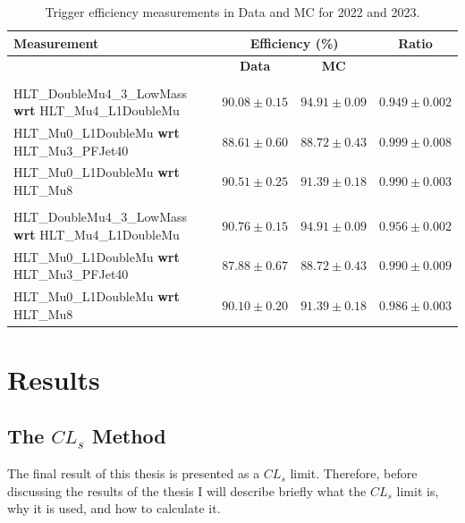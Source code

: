 \begin{table}[ht]
    \centering
    \begin{tabular}{|>{\footnotesize\raggedright\arraybackslash}p{10cm}|c|c|c|}
    \hline
    \textbf{Measurement} & \multicolumn{2}{c|}{\textbf{Efficiency (\%)}} & \textbf{Ratio} \\
    \cline{2-3}
    & \textbf{Data} & \textbf{MC} & \\
    \hline
    \multicolumn{4}{|c|}{\textbf{2022}} \\
    \hline
    HLT\_DoubleMu4\_3\_LowMass \textbf{wrt} HLT\_Mu4\_L1DoubleMu & $90.08 \pm 0.15$ & $94.91 \pm 0.09$ & $0.949 \pm 0.002$ \\
    HLT\_Mu0\_L1DoubleMu \textbf{wrt} HLT\_Mu3\_PFJet40 & $88.61 \pm 0.60$ & $88.72 \pm 0.43$ & $0.999 \pm 0.008$ \\
    HLT\_Mu0\_L1DoubleMu \textbf{wrt} HLT\_Mu8 & $90.51 \pm 0.25$ & $91.39 \pm 0.18$ & $0.990 \pm 0.003$ \\
    \hline
    \multicolumn{4}{|c|}{\textbf{2023}} \\
    \hline
    HLT\_DoubleMu4\_3\_LowMass \textbf{wrt} HLT\_Mu4\_L1DoubleMu & $90.76 \pm 0.15$ & $94.91 \pm 0.09$ & $0.956 \pm 0.002$ \\
    HLT\_Mu0\_L1DoubleMu \textbf{wrt} HLT\_Mu3\_PFJet40 & $87.88 \pm 0.67$ & $88.72 \pm 0.43$ & $0.990 \pm 0.009$ \\
    HLT\_Mu0\_L1DoubleMu \textbf{wrt} HLT\_Mu8 & $90.10 \pm 0.20$ & $91.39 \pm 0.18$ & $0.986 \pm 0.003$ \\
    \hline
    \end{tabular}
    \caption{Trigger efficiency measurements in Data and MC for 2022 and 2023.}
    \label{tab:trigger_efficiency}
\end{table}

\section{Results}

\subsection{The $CL_s$ Method}

The final result of this thesis is presented as a $CL_s$ limit. Therefore, before discussing the results of the thesis I will describe briefly what the $CL_s$ limit is, why it is used, and how to calculate it. 

